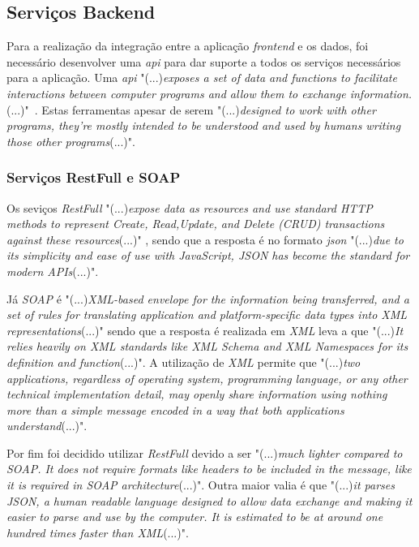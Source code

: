 \subsection{Serviços Backend}

Para a realização da integração entre a aplicação \emph{frontend} e os dados, foi necessário desenvolver uma \textit{\acrfull{api}} para dar suporte a todos os serviços necessários para a aplicação.
Uma \textit{\acrshort{api}} "(...)\emph{exposes a set of data and functions to facilitate interactions between computer programs and allow them to exchange information.}(...)"~\citep{rest_cookbook}.
Estas ferramentas apesar de serem "(...)\emph{designed to work with other programs, they’re mostly intended to be understood and used by humans writing those other programs}(...)"\citep{api_design}.

\subsubsection{Serviços RestFull e SOAP}
Os seviços \emph{RestFull} "(...)\emph{expose data as resources and use standard HTTP methods to represent Create, Read,Update, and Delete (CRUD) transactions against these resources}(...)"
\citep{api_design}, sendo que a resposta é no formato \textit{\acrfull{json}} "(...)\emph{due to its simplicity and ease of use with JavaScript, JSON has become the standard for modern APIs}(...)"\citep{api_design}.

Já \emph{SOAP} é "(...)\emph{XML-based envelope for the information being transferred, and a set of rules for translating application and platform-specific data types into XML representations}(...)"\citep{Snell2002} sendo que a resposta é realizada em \emph{XML} leva a que "(...)\emph{It relies heavily on XML standards like XML Schema and XML Namespaces for its definition and function}(...)"\citep{Snell2002}. A utilização de \emph{XML} permite que "(...)\emph{two applications, regardless of operating system, programming language, or any other technical implementation detail, may openly share information using nothing more than a simple message encoded in a way that both applications understand}(...)"\citep{Snell2002}.

Por fim foi decidido utilizar \emph{RestFull} devido a ser "(...)\emph{much lighter compared to SOAP. It does not require formats like headers to be included in the message, like it is required in SOAP architecture}(...)"\citep{Halili2018}. Outra maior valia é que "(...)\emph{it parses JSON, a human readable language designed to allow data exchange and making it easier to parse and use by the computer. It is estimated to be at around one hundred times faster than XML}(...)"\citep{Halili2018}.

